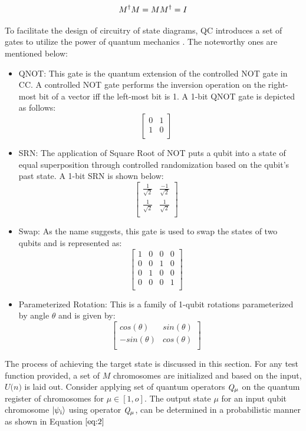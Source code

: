\documentclass[conference]{IEEEtran}
\begin{document}
\begin{equation}
\label{eq:1}
M\textsuperscript{$\dagger$}M = MM\textsuperscript{$\dagger$} = I
\end{equation}


To facilitate the design of circuitry of state diagrams, QC introduces a set of gates to utilize the power of quantum mechanics \cite{qg}. The noteworthy ones are mentioned below:

\begin{itemize}
\item QNOT: This gate is the quantum extension of the controlled NOT gate in CC. A controlled NOT gate performs the inversion operation on the right-most bit of a vector iff the left-most bit is 1. A 1-bit QNOT gate is depicted as follows:
$$
\begin{bmatrix} 
0&1\\
1&0\\
\end{bmatrix}
\quad
$$
\item SRN: The application of Square Root of NOT puts a qubit into a state of equal superposition through controlled randomization based on the qubit's past state. A 1-bit SRN is shown below:
$$
\begin{bmatrix} 
\frac{1}{\sqrt{2}}&\frac{-1}{\sqrt{2}}\\
\frac{1}{\sqrt{2}}&\frac{1}{\sqrt{2}}\\
\end{bmatrix}
\quad
$$
\item Swap: As the name suggests, this gate is used to swap the states of two qubits and is represented as:
$$
\begin{bmatrix} 
{1}&{0}&{0}&{0}\\
{0}&{0}&{1}&{0}\\
{0}&{1}&{0}&{0}\\
{0}&{0}&{0}&{1}\\
\end{bmatrix}
\quad
$$
\item Parameterized Rotation: This is a family of 1-qubit rotations parameterized by angle $\theta$ and is given by:
$$
\begin{bmatrix} 
cos(\theta)&sin(\theta)\\
-sin(\theta)&cos(\theta)\\
\end{bmatrix}
\quad
$$
\end{itemize}

The process of achieving the target state is discussed in this section. For any test function provided, a set of $\textit{M}$ chromosomes are initialized and based on the input, $\textit{U(n)}$ is laid out. Consider applying set of quantum operators $\textit{Q\textsubscript{$\mu$}}$ on the quantum register of chromosomes for $\mu \in [1,o]$. The output state $\mu$ for an input qubit chromosome $\ket{\psi\textsubscript{i}}$ using operator $\textit{Q\textsubscript{$\mu$}}$, can be determined in a probabilistic manner as shown in Equation $\ref{eq:2}$
\end{document}
